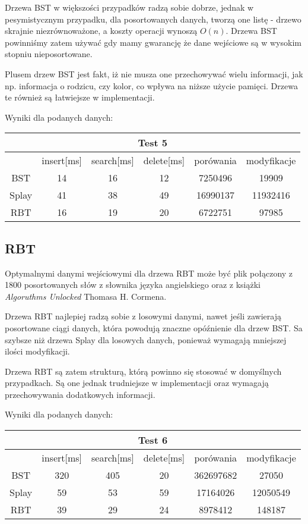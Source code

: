 \documentclass[titlepage]{article}
\begin{document}
Drzewa BST w większości przypadków radzą sobie dobrze, jednak w pesymistycznym przypadku, dla posortowanych danych, tworzą one listę - drzewo skrajnie niezrównoważone, a koszty operacji wynoszą $O(n)$. Drzewa BST powinniśmy zatem używać gdy mamy gwarancję że dane wejściowe są w wysokim stopniu nieposortowane.

Plusem drzew BST jest fakt, iż nie musza one przechowywać wielu informacji, jak np. informacja o rodzicu, czy kolor, co wpływa na niższe użycie pamięci. Drzewa te również są łatwiejsze w implementacji.

Wyniki dla podanych danych: 
\begin{table}[h!]
	\centering
    \label{tab:table5}
    \begin{tabular}{|c|c|c|c|c|c|}
    		\multicolumn{6}{c}{Test 5}\\
    		\hline
      	& insert[ms] & search[ms] & delete[ms] & porówania & modyfikacje\\
      	\hline
      	BST & 14 & 16 & 12 & 7250496 & 19909\\
      	\hline
      	Splay & 41 & 38 & 49 & 16990137 & 11932416\\
      	\hline
      	RBT & 16 & 19 & 20 & 6722751 & 97985\\
		\hline
    \end{tabular}
\end{table}

\subsection{RBT}
Optymalnymi danymi wejściowymi dla drzewa RBT może być plik połączony z 1800 posortowanych słów z słownika języka angielskiego oraz z książki \textit{Algoruthms Unlocked} Thomasa H. Cormena.

Drzewa RBT najlepiej radzą sobie z losowymi danymi, nawet jeśli zawierają posortowane ciągi danych, która powodują znaczne opóźnienie dla drzew BST. Sa szybsze niż drzewa Splay dla losowych danych, ponieważ wymagają mniejszej ilości modyfikacji.

Drzewa RBT są zatem strukturą, którą powinno się stosować w domyślnych przypadkach. Są one jednak trudniejsze w implementacji oraz wymagają przechowywania dodatkowych informacji.

Wyniki dla podanych danych: 
\begin{table}[h!]
	\centering
    \label{tab:table5}
    \begin{tabular}{|c|c|c|c|c|c|}
    		\multicolumn{6}{c}{Test 6}\\
    		\hline
      	& insert[ms] & search[ms] & delete[ms] & porówania & modyfikacje\\
      	\hline
      	BST & 320 & 405 & 20 & 362697682 & 27050\\
      	\hline
      	Splay & 59 & 53 & 59 & 17164026 & 12050549\\
      	\hline
      	RBT & 39 & 29 & 24 & 8978412 & 148187\\
		\hline
    \end{tabular}
\end{table}
\end{document}
